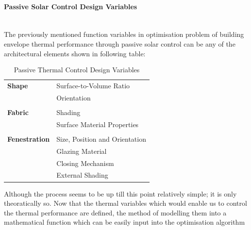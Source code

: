\documentclass[11pt,a4paper,oneside]{article}
\begin{document}
\begin{multicols}{2}
\paragraph{Passive Solar Control Design Variables}\mbox{}\\

The previously mentioned function variables in optimisation problem of building envelope thermal performance through passive solar control can be any of the architectural elements shown in following table:

\begin{table}[H]
	\centering
	\begin{tabular}{l|l}
		\textbf{Shape}&Surface-to-Volume Ratio\\
		&Orientation\\
		&\\
		\textbf{Fabric}&Shading\\
		&Surface Material Properties\\
		&\\
		\textbf{Fenestration}&Size, Position and Orientation\\
		&Glazing Material\\
		&Closing Mechanism\\
		&External Shading\\
	\end{tabular}
	\caption{Passive Thermal Control Design Variables}
	\label{tab:ThermalDesignVariables}
\end{table}

Although the process seems to be up till this point relatively simple; it is only theoratically so. Now that the thermal variables which would enable us to control the thermal performance are defined, the method of modelling them into a mathematical function which can be easily input into the optimisation algorithm


\end{multicols}



\end{document}
